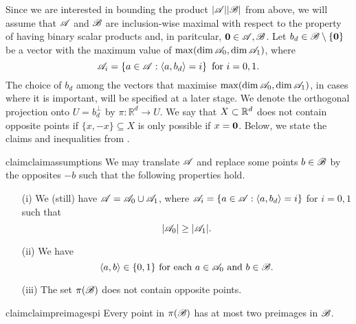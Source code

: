 \noindent Since we are interested in bounding the product $|{\mathscr{A}}||{\mathscr{B}}|$ from above, we will assume that ${\mathscr{A}}$ and ${\mathscr{B}}$ are inclusion-wise maximal with respect to the property of having binary scalar products and, in paritcular, $\mathbf{0} \in {\mathscr{A}},{\mathscr{B}}$. Let $b_d \in {\mathscr{B}} \setminus \{\mathbf{0}\}$ be a vector with the maximum value of $\operatorname{max}(\operatorname{dim}{\mathscr{A}}_0,\operatorname{dim}{\mathscr{A}}_1)$, where 
\[
    {\mathscr{A}}_i=\left\{a \in {\mathscr{A}}:\left\langle a, b_d\right\rangle=i\right\} \text{ for } i=0, 1.
\]
The choice of $b_d$ among the vectors that maximise $\operatorname{max}(\operatorname{dim}{\mathscr{A}}_0,\operatorname{dim}{\mathscr{A}}_1)$, in cases where it is important, will be specified at a later stage. %
We denote the orthogonal projection onto $U=b_d^\bot$ by $\pi: \mathbb{R}^d \rightarrow U$. We say that $X\subset {\mathbb{R}}^d$ does not contain opposite points if  $\{x,-x\}\subseteq X$ is only possible if $x=\mathbf{0}$. Below, we state the claims and inequalities from \cite{kupavskii22}.

\begin{restatable}{claim}{claimassumptions}
    \label{cl1}
    We may translate ${\mathscr{A}}$ and replace some points $b\in{\mathscr{B}}$ by the opposites $-b$ such that the following properties hold.
    \begin{itemize}
        \item[(i)] We (still) have ${\mathscr{A}} = {\mathscr{A}}_0 \cup {\mathscr{A}}_1$, where ${\mathscr{A}}_i = \{ a \in {\mathscr{A}} : \langle a, b_d\rangle = i\}$ for $i=0,1$ such that
            \begin{equation} \label{eqa0gea1}
                |{\mathscr{A}}_0| \ge |{\mathscr{A}}_1|.
            \end{equation}
        \item[(ii)] We  have
            \begin{equation}
                \label{eqscala0}
                \langle a, b\rangle \in \{0,1\} \text{ for each } a \in {\mathscr{A}}_0 \text{ and } b \in {\mathscr{B}}.
            \end{equation}
        \item[(iii)] The set $\pi({\mathscr{B}})$ does not contain opposite points.
    \end{itemize}
\end{restatable}

\begin{restatable}{claim}{claimpreimagespi}\label{cl2}
   Every point in $\pi({\mathscr{B}})$ has at most two preimages in ${\mathscr{B}}$.
\end{restatable}

